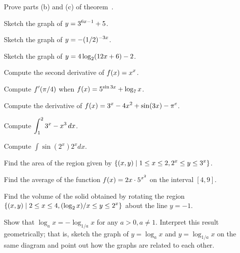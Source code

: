\endexercise

\exercise Prove parts (b) and (c) of theorem~.
\endexercise

\exercise Sketch the graph of $\displaystyle y=3^{6x-1} + 5 $.
\endexercise

\exercise Sketch the graph of $\displaystyle y= -(1/2)^{-3x}$. 
\endexercise

\exercise Sketch the graph of $\displaystyle y=4\log_2 (12x + 6)-2$.
\endexercise

\exercise Compute the second derivative of $\displaystyle f(x)=x^x$.
\endexercise

\exercise Compute $\displaystyle f'(\pi/4)$ when $\displaystyle f(x)
= 5^{\sin 3x} + \log_7 x$. 
\endexercise

\exercise Compute the derivative of 
$\displaystyle f(x) = 3^x - 4x^2 + \sin(3x) - \pi^e$. 
\endexercise

\exercise Compute $\displaystyle \int_1^2 3^x - x^3\,dx$.
\endexercise

\exercise Compute $\int \sin (2^x ) 2^x dx $.
\endexercise

\exercise Find the area of the region given by
$\displaystyle \{(x, y) \mid 1 \leq x \leq 2 , 2^x \leq y \leq 3^x\}$.
\endexercise

\exercise Find the average of the function $\displaystyle f(x)= 2x\cdot 5^{x^2}$
on the interval $[4,9]$.

\endexercise

\exercise Find the volume of the solid obtained by rotating the
region
$\displaystyle \{(x,y) \mid 2 \leq x \leq 4, (\log _2 x)/x
\leq y \leq 2^x \}$ about the line $y=-1 $. 
\endexercise

\exercise Show that $\log_a x =-\log_{1/a} x $ for any
 $a>0, a\neq 1$.
 Interpret this result geometrically; that is, sketch the graph of
 $y=\log_a x$ and $y=\log_{1/a} x$ on the same diagram and
 point out how the graphs are related to each other.
\endexercise

\endexercises

